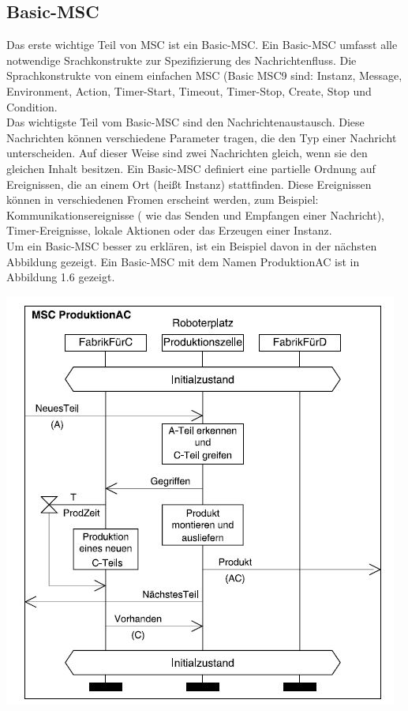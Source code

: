 \subsection{Basic-MSC}
Das erste wichtige Teil von MSC ist ein Basic-MSC. Ein Basic-MSC umfasst alle notwendige Srachkonstrukte zur Spezifizierung des Nachrichtenfluss.
Die Sprachkonstrukte von einem einfachen MSC (Basic MSC9 sind: Instanz, Message, Environment, Action, Timer-Start, Timeout, Timer-Stop, Create, Stop und Condition. \\
Das wichtigste Teil vom Basic-MSC sind den Nachrichtenaustausch. Diese Nachrichten können verschiedene Parameter tragen, die den Typ einer Nachricht unterscheiden. Auf dieser Weise sind zwei Nachrichten gleich, wenn sie den gleichen Inhalt besitzen.
Ein Basic-MSC definiert eine partielle Ordnung auf Ereignissen, die an einem Ort (heißt Instanz) stattfinden.
Diese Ereignissen können in verschiedenen Fromen erscheint werden, zum Beispiel: Kommunikationsereignisse ( wie das Senden und Empfangen einer Nachricht), Timer-Ereignisse, lokale Aktionen oder das Erzeugen einer Instanz.\\
Um ein Basic-MSC besser zu erklären, ist ein Beispiel davon in der nächsten Abbildung gezeigt.
Ein Basic-MSC mit dem Namen ProduktionAC ist in
Abbildung 1.6 gezeigt.


\includegraphics[scale=1]{Graphics/MSC1.jpg}

